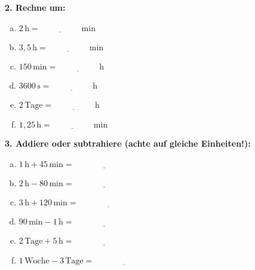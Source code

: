 \textbf{2. Rechne um:}
\begin{multicols}{2}
\begin{enumerate}[a)]
    \item $2\,\mathrm{h} = \underline{\hspace{2cm}}\,\mathrm{min}$
    \item $3{,}5\,\mathrm{h} = \underline{\hspace{2cm}}\,\mathrm{min}$
    \item $150\,\mathrm{min} = \underline{\hspace{2cm}}\,\mathrm{h}$
    \item $3600\,\mathrm{s} = \underline{\hspace{2cm}}\,\mathrm{h}$
    \item $2\,\mathrm{Tage} = \underline{\hspace{2cm}}\,\mathrm{h}$
    \item $1{,}25\,\mathrm{h} = \underline{\hspace{2cm}}\,\mathrm{min}$
\end{enumerate}
\end{multicols}

\vspace{0.5em}

\textbf{3. Addiere oder subtrahiere (achte auf gleiche Einheiten!):}
\begin{multicols}{2}
\begin{enumerate}[a)]
    \item $1\,\mathrm{h} + 45\,\mathrm{min} = \underline{\hspace{3cm}}$
    \item $2\,\mathrm{h} - 80\,\mathrm{min} = \underline{\hspace{3cm}}$
    \item $3\,\mathrm{h} + 120\,\mathrm{min} = \underline{\hspace{3cm}}$
    \item $90\,\mathrm{min} - 1\,\mathrm{h} = \underline{\hspace{3cm}}$
    \item $2\,\mathrm{Tage} + 5\,\mathrm{h} = \underline{\hspace{3cm}}$
    \item $1\,\mathrm{Woche} - 3\,\mathrm{Tage} = \underline{\hspace{3cm}}$
\end{enumerate}
\end{multicols}

\vspace{0.5em}

